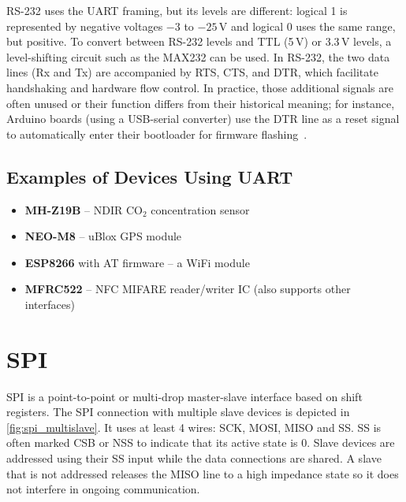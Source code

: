 RS-232 uses the \gls{UART} framing, but its levels are different: logical 1 is represented by negative voltages $-3$ to $-25$\,V and logical 0 uses the same range, but positive. To convert between RS-232 levels and \gls{TTL} (5\,V)  or 3.3\,V levels, a level-shifting circuit such as the MAX232 can be used. In RS-232, the two data lines (Rx and Tx) are accompanied by \gls{RTS}, \gls{CTS}, and \gls{DTR}, which facilitate handshaking and hardware flow control. In practice, those additional signals are often unused or their function differs from their historical meaning; for instance, Arduino boards (using a USB-serial converter) use the \gls{DTR} line as a reset signal to automatically enter their bootloader for firmware flashing~\cite{arduinodtr}.

\subsection{Examples of Devices Using UART}

\begin{itemize}
	\item \textbf{MH-Z19B} -- \gls{NDIR} CO$_2$ concentration sensor
	\item \textbf{NEO-M8} -- uBlox \gls{GPS} module
	\item \textbf{ESP8266} with AT firmware -- a WiFi module
	\item \textbf{MFRC522} -- \gls{NFC} MIFARE reader/writer \gls{IC} (also supports other interfaces)
\end{itemize}

\section{SPI} \label{sec:theory_spi}

\acrfull{SPI} is a point-to-point or multi-drop master-slave interface based on shift registers. The \gls{SPI} connection with multiple slave devices is depicted in \cref{fig:spi_multislave}. It uses at least 4 wires: \gls{SCK}, \gls{MOSI}, \gls{MISO} and \gls{SS}. \gls{SS} is often marked \gls{CSB} or \gls{NSS} to indicate that its active state is 0. Slave devices are addressed using their \gls{SS} input while the data connections are shared. A slave that is not addressed releases the \gls{MISO} line to a high impedance state so it does not interfere in ongoing communication.

